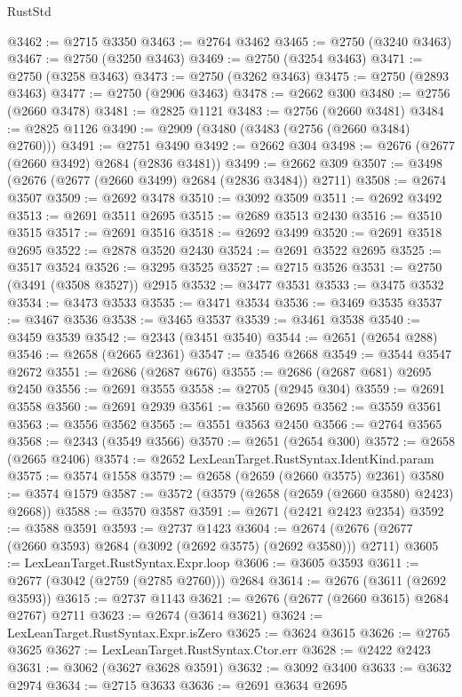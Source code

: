 \begin{lexlean}{RustStd}
\begin{coremodule}
{\begin{coremodule}
{{{{{{{{{{{{{{{{{{{{{{{{{{{{{{{{{{{{{{{{{{{{{{{{{{{{{{{@3462 := @2715 @3350
@3463 := @2764 @3462
@3465 := @2750 (@3240 @3463)
@3467 := @2750 (@3250 @3463)
@3469 := @2750 (@3254 @3463)
@3471 := @2750 (@3258 @3463)
@3473 := @2750 (@3262 @3463)
@3475 := @2750 (@2893 @3463)
@3477 := @2750 (@2906 @3463)
@3478 := @2662 @300
@3480 := @2756 (@2660 @3478)
@3481 := @2825 @1121
@3483 := @2756 (@2660 @3481)
@3484 := @2825 @1126
@3490 := @2909 (@3480 (@3483 (@2756 (@2660 @3484) @2760)))
@3491 := @2751 @3490
@3492 := @2662 @304
@3498 := @2676 (@2677 (@2660 @3492) @2684 (@2836 @3481))
@3499 := @2662 @309
@3507 := @3498 (@2676 (@2677 (@2660 @3499) @2684 (@2836 @3484)) @2711)
@3508 := @2674 @3507
@3509 := @2692 @3478
@3510 := @3092 @3509
@3511 := @2692 @3492
@3513 := @2691 @3511 @2695
@3515 := @2689 @3513 @2430
@3516 := @3510 @3515
@3517 := @2691 @3516
@3518 := @2692 @3499
@3520 := @2691 @3518 @2695
@3522 := @2878 @3520 @2430
@3524 := @2691 @3522 @2695
@3525 := @3517 @3524
@3526 := @3295 @3525
@3527 := @2715 @3526
@3531 := @2750 (@3491 (@3508 @3527)) @2915
@3532 := @3477 @3531
@3533 := @3475 @3532
@3534 := @3473 @3533
@3535 := @3471 @3534
@3536 := @3469 @3535
@3537 := @3467 @3536
@3538 := @3465 @3537
@3539 := @3461 @3538
@3540 := @3459 @3539
@3542 := @2343 (@3451 @3540)
@3544 := @2651 (@2654 @288)
@3546 := @2658 (@2665 @2361)
@3547 := @3546 @2668
@3549 := @3544 @3547 @2672
@3551 := @2686 (@2687 @676)
@3555 := @2686 (@2687 @681) @2695 @2450
@3556 := @2691 @3555
@3558 := @2705 (@2945 @304)
@3559 := @2691 @3558
@3560 := @2691 @2939
@3561 := @3560 @2695
@3562 := @3559 @3561
@3563 := @3556 @3562
@3565 := @3551 @3563 @2450
@3566 := @2764 @3565
@3568 := @2343 (@3549 @3566)
@3570 := @2651 (@2654 @300)
@3572 := @2658 (@2665 @2406)
@3574 := @2652 LexLeanTarget.RustSyntax.IdentKind.param
@3575 := @3574 @1558
@3579 := @2658 (@2659 (@2660 @3575) @2361)
@3580 := @3574 @1579
@3587 := @3572 (@3579 (@2658 (@2659 (@2660 @3580) @2423) @2668))
@3588 := @3570 @3587
@3591 := @2671 (@2421 @2423 @2354)
@3592 := @3588 @3591
@3593 := @2737 @1423
@3604 := @2674 (@2676 (@2677 (@2660 @3593) @2684 (@3092 (@2692 @3575) (@2692 @3580))) @2711)
@3605 := LexLeanTarget.RustSyntax.Expr.loop
@3606 := @3605 @3593
@3611 := @2677 (@3042 (@2759 (@2785 @2760))) @2684
@3614 := @2676 (@3611 (@2692 @3593))
@3615 := @2737 @1143
@3621 := @2676 (@2677 (@2660 @3615) @2684 @2767) @2711
@3623 := @2674 (@3614 @3621)
@3624 := LexLeanTarget.RustSyntax.Expr.isZero
@3625 := @3624 @3615
@3626 := @2765 @3625
@3627 := LexLeanTarget.RustSyntax.Ctor.err
@3628 := @2422 @2423
@3631 := @3062 (@3627 @3628 @3591)
@3632 := @3092 @3400
@3633 := @3632 @2974
@3634 := @2715 @3633
@3636 := @2691 @3634 @2695
}}}}}}}}}}}}}}}}}}}}}}}}}}}}}}}}}}}}}}}}}}}}}}}}}}}}}}}
\end{coremodule}}
\end{coremodule}
\end{lexlean}
